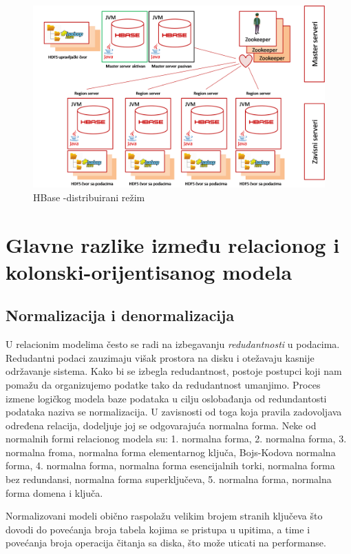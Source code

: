 \documentclass[12pt,oneside]{memoir}
\begin{document}
\begin{figure}[!ht]
  \centering
  \includegraphics[width=1\textwidth]{hbase-distributed.png}
  \caption{HBase -distribuirani režim}
  \label{fig:grafikon}
\end{figure}


\pagebreak

\section{Glavne razlike između relacionog i kolonski-orijentisanog modela}


\subsection{Normalizacija i denormalizacija}

U relacionim modelima često se radi na izbegavanju \textit{redudantnosti} u podacima. Redudantni podaci zauzimaju višak prostora na disku i otežavaju kasnije održavanje sistema. Kako bi se izbegla redudantnost, postoje postupci koji nam pomažu da organizujemo podatke tako da redudantnost umanjimo. Proces izmene logičkog modela baze podataka u cilju oslobađanja od redundantosti podataka naziva se normalizacija. U zavisnosti od toga koja pravila zadovoljava određena relacija, dodeljuje joj se odgovarajuća normalna forma. Neke od normalnih formi relacionog modela su: 1. normalna forma, 2. normalna forma, 3. normalna froma, normalna forma elementarnog ključa, Bojs-Kodova normalna forma, 4. normalna forma, normalna forma esencijalnih torki, normalna forma bez redundansi, normalna forma superključeva, 5. normalna forma, normalna forma domena i ključa.

Normalizovani modeli obično raspolažu velikim brojem stranih ključeva što dovodi do povećanja broja tabela kojima se pristupa u upitima, a time i povećanja broja operacija čitanja sa diska, što može uticati na performanse.
\end{document}
